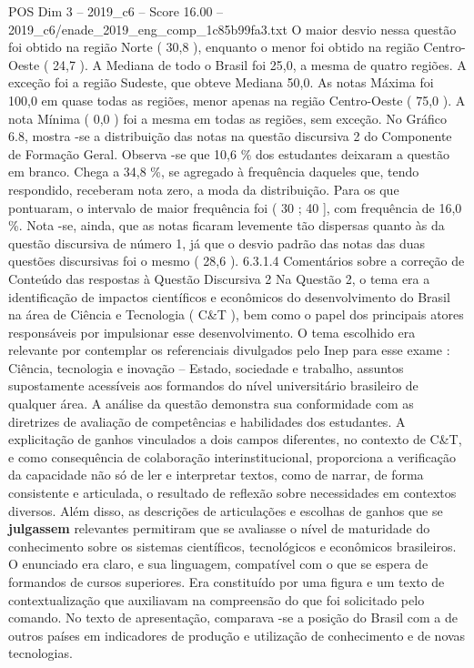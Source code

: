 \begin{textsample}{POS Dim 3 – 2019\_c6 – Score 16.00 – 2019\_c6/enade\_2019\_eng\_comp\_1c85b99fa3.txt}
O maior desvio nessa questão foi obtido na região Norte ( 30,8 ), enquanto o menor foi obtido na região Centro-Oeste ( 24,7 ).
A Mediana de todo o Brasil foi 25,0, a mesma de quatro regiões.
A exceção foi a região Sudeste, que obteve Mediana 50,0.
As notas Máxima foi 100,0 em quase todas as regiões, menor apenas na região Centro-Oeste ( 75,0 ).
A nota Mínima ( 0,0 ) foi a mesma em todas as regiões, sem exceção.
No Gráfico 6.8, mostra -se a distribuição das notas na questão discursiva 2 do Componente de Formação Geral.
Observa -se que 10,6 \% dos estudantes deixaram a questão em branco.
Chega a 34,8 \%, se agregado à frequência daqueles que, tendo respondido, receberam nota zero, a moda da distribuição.
Para os que pontuaram, o intervalo de maior frequência foi ( 30 ; 40 ], com frequência de 16,0 \%.
Nota -se, ainda, que as notas ficaram levemente tão dispersas quanto às da questão discursiva de número 1, já que o desvio padrão das notas das duas questões discursivas foi o mesmo ( 28,6 ). 6.3.1.4 Comentários sobre a correção de Conteúdo das respostas à Questão Discursiva 2 Na Questão 2, o tema era a identificação de impactos científicos e econômicos do desenvolvimento do Brasil na área de Ciência e Tecnologia ( C\&T ), bem como o papel dos principais atores responsáveis por impulsionar esse desenvolvimento.
O tema escolhido era relevante por contemplar os referenciais divulgados pelo Inep para esse exame : Ciência, tecnologia e inovação – Estado, sociedade e trabalho, assuntos supostamente acessíveis aos formandos do nível universitário brasileiro de qualquer área.
A análise da questão demonstra sua conformidade com as diretrizes de avaliação de competências e habilidades dos estudantes.
A explicitação de ganhos vinculados a dois campos diferentes, no contexto de C\&T, e como consequência de colaboração interinstitucional, proporciona a verificação da capacidade não só de ler e interpretar textos, como de narrar, de forma consistente e articulada, o resultado de reflexão sobre necessidades em contextos diversos.
Além disso, as descrições de articulações e escolhas de ganhos que se \textbf{julgassem} relevantes permitiram que se avaliasse o nível de maturidade do conhecimento sobre os sistemas científicos, tecnológicos e econômicos brasileiros.
O enunciado era claro, e sua linguagem, compatível com o que se espera de formandos de cursos superiores.
Era constituído por uma figura e um texto de contextualização que auxiliavam na compreensão do que foi solicitado pelo comando.
No texto de apresentação, comparava -se a posição do Brasil com a de outros países em indicadores de produção e utilização de conhecimento e de novas tecnologias.

\end{textsample}
